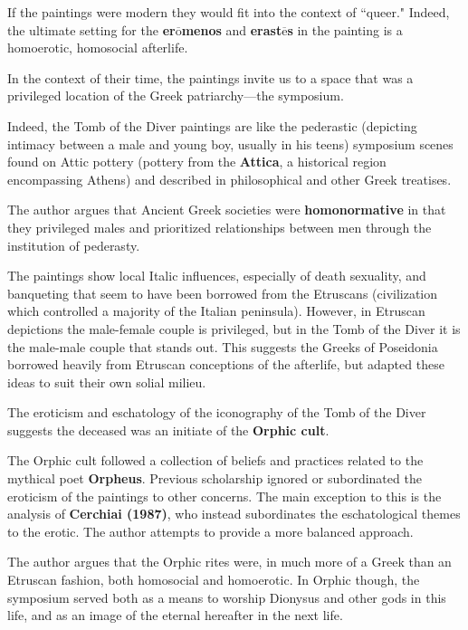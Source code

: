 If the paintings were modern they would fit into the context of ``queer." Indeed, the ultimate setting for the \textbf{er$\overline{\text{o}}$menos} and \textbf{erast$\overline{\text{e}}$s} in the painting is a homoerotic, homosocial afterlife.

\begin{rmk}
    In the context of their time, the paintings invite us to a space that was a privileged location of the Greek patriarchy---the symposium.
\end{rmk}

Indeed, the Tomb of the Diver paintings are like the pederastic (depicting intimacy between a male and young boy, usually in his teens) symposium scenes found on Attic pottery (pottery from the \textbf{Attica}, a historical region encompassing Athens) and described in philosophical and other Greek treatises. 

\begin{nte}
    The author argues that Ancient Greek societies were \textbf{homonormative} in that they privileged males and prioritized relationships between men through the institution of pederasty.
\end{nte}

The paintings show local Italic influences, especially of death sexuality, and banqueting that seem to have been borrowed from the Etruscans (civilization which controlled a majority of the Italian peninsula). However, in Etruscan depictions the male-female couple is privileged, but in the Tomb of the Diver it is the male-male couple that stands out. This suggests the Greeks of Poseidonia borrowed heavily from Etruscan conceptions of the afterlife, but adapted these ideas to suit their own solial milieu.

\begin{rmk}
    The eroticism and eschatology of the iconography of the Tomb of the Diver suggests the deceased was an initiate of the \textbf{Orphic cult}.
\end{rmk}

The Orphic cult followed a collection of beliefs and practices related to the mythical poet \textbf{Orpheus}. Previous scholarship ignored or subordinated the eroticism of the paintings to other concerns. The main exception to this is the analysis of \textbf{Cerchiai (1987)}, who instead subordinates the eschatological themes to the erotic. The author attempts to provide a more balanced approach.

\begin{nte}
    The author argues that the Orphic rites were, in much more of a Greek than an Etruscan fashion, both homosocial and homoerotic. In Orphic though, the symposium served both as a means to worship Dionysus and other gods in this life, and as an image of the eternal hereafter in the next life.
\end{nte}




